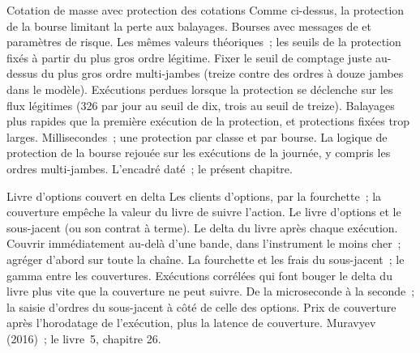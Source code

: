 \begin{strategyfile}{Cotation de masse avec protection des cotations}\label{strat:hf:automated-options-market-making:mass}
 Comme ci-dessus, la protection de la bourse limitant la perte aux balayages.
 Bourses avec messages de  et paramètres de risque.
 Les mêmes valeurs théoriques~; les seuils de la protection fixés à partir du plus gros ordre légitime.
 Fixer le seuil de comptage juste au-dessus du plus gros ordre multi-jambes (treize contre des ordres à douze jambes dans le modèle).
 Exécutions perdues lorsque la protection se déclenche sur les flux légitimes (326 par jour au seuil de dix, trois au seuil de treize).
 Balayages plus rapides que la première exécution de la protection, et protections fixées trop larges.
 Millisecondes~; une protection par classe et par bourse.
 La logique de protection de la bourse rejouée sur les exécutions de la journée, y compris les ordres multi-jambes.
 L'encadré daté~; le présent chapitre.
\end{strategyfile}

\begin{strategyfile}{Livre d'options couvert en delta}\label{strat:hf:automated-options-market-making:delta}
 Les clients d'options, par la fourchette~; la couverture empêche la valeur du livre de suivre l'action.
 Le livre d'options et le sous-jacent (ou son contrat à terme).
 Le delta du livre après chaque exécution.
 Couvrir immédiatement au-delà d'une bande, dans l'instrument le moins cher~; agréger d'abord sur toute la chaîne.
 La fourchette et les frais du sous-jacent~; le gamma entre les couvertures.
 Exécutions corrélées qui font bouger le delta du livre plus vite que la couverture ne peut suivre.
 De la microseconde à la seconde~; la saisie d'ordres du sous-jacent à côté de celle des options.
 Prix de couverture après l'horodatage de l'exécution, plus la latence de couverture.
 Muravyev (2016)~; le livre~5, chapitre 26.
\end{strategyfile}

